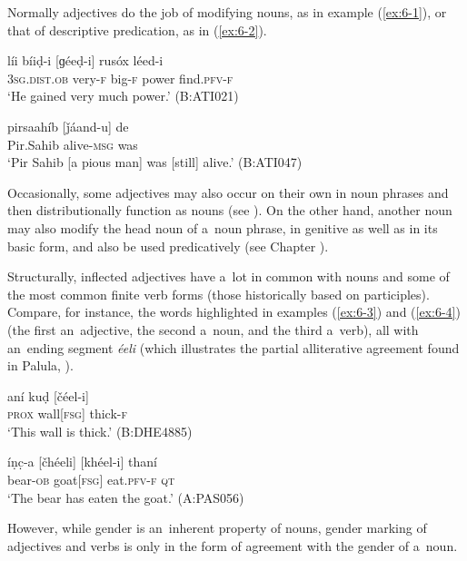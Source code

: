Normally adjectives do the job of modifying nouns, as in example (\ref{ex:6-1}), or that of descriptive predication, as in (\ref{ex:6-2}).

\begin{exe}
\ex
\label{ex:6-1}
\gll líi bíiḍ-i [ɡéeḍ-i] rusóx léed-i \\
\textsc{3sg.dist.ob} very-\textsc{f} big-\textsc{f} power find.\textsc{pfv-f} \\
\glt `He gained very much power.' (B:ATI021)

\ex
\label{ex:6-2}
\gll pirsaahíb [ǰáand-u] de \\
Pir.Sahib alive-\textsc{msg} was  \\
\glt `Pir Sahib [a pious man] was [still] alive.' (B:ATI047)
\end{exe}

Occasionally, some adjectives may also occur on their own in noun phrases and then distributionally function as nouns (see ). On the other hand, another noun may also modify the head noun of a~noun phrase, in genitive as well as in its basic form, and also be used predicatively (see Chapter ).


Structurally, inflected adjectives have a~lot in common with nouns and some of the most common finite verb forms (those historically based on participles). Compare, for instance, the words highlighted in examples (\ref{ex:6-3}) and (\ref{ex:6-4}) (the first an~adjective, the second a~noun, and the third a~verb), all with an~ending segment \textit{éeli} (which illustrates the partial alliterative agreement found in Palula, \citealt[87--88]{corbett2006}).

\begin{exe}
\ex
\label{ex:6-3}
\gll aní kuḍ [čéel-i] \\
\textsc{prox} wall[\textsc{fsg}] thick-\textsc{f} \\
\glt `This wall is thick.' (B:DHE4885)

\ex
\label{ex:6-4}
\gll íṇc̣-a [čhéeli] [khéel-i] thaní \\
bear-\textsc{ob} goat[\textsc{fsg}] eat.\textsc{pfv-f} \textsc{qt} \\
\glt `The bear has eaten the goat.' (A:PAS056)
\end{exe}

However, while gender is an~inherent property of nouns, gender marking of adjectives and verbs is only in the form of agreement with the gender of a~noun. 


